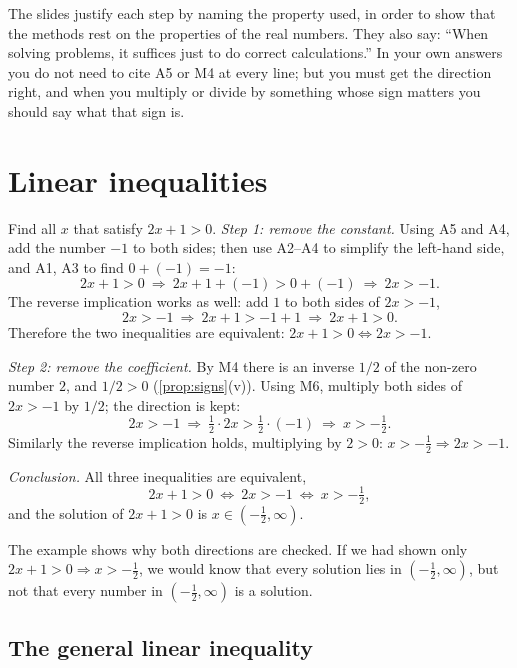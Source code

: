 \begin{note}
The slides justify each step by naming the property used, in order to show that the methods rest on the
properties of the real numbers. They also say: ``When solving problems, it suffices just to do correct
calculations.''  In your own answers you do not need to cite A5 or M4 at every line; but you
must get the direction right, and when you multiply or divide by something whose sign matters you should say
what that sign is.
\end{note}

\section{Linear inequalities}\label{sec:linear-ineq}

\begin{example}
Find all $x$ that satisfy $2x+1>0$. 
\solution
\emph{Step 1: remove the constant.} Using A5 and A4, add the number $-1$ to both sides; then use A2--A4 to
simplify the left-hand side, and A1, A3 to find $0+(-1)=-1$:
\[
2x+1>0\ \Longrightarrow\ 2x+1+(-1)>0+(-1)\ \Longrightarrow\ 2x>-1.
\]
The reverse implication works as well: add $1$ to both sides of $2x>-1$,
\[
2x>-1\ \Longrightarrow\ 2x+1>-1+1\ \Longrightarrow\ 2x+1>0.
\]
Therefore the two inequalities are equivalent: $2x+1>0\Leftrightarrow 2x>-1$.

\emph{Step 2: remove the coefficient.} By M4 there is an inverse $1/2$ of the non-zero number $2$, and
$1/2>0$ (\cref{prop:signs}(v)). Using M6, multiply both sides of $2x>-1$ by $1/2$; the direction is kept:
\[
2x>-1\ \Longrightarrow\ \tfrac12\cdot 2x>\tfrac12\cdot(-1)\ \Longrightarrow\ x>-\tfrac12.
\]
Similarly the reverse implication holds, multiplying by $2>0$: $x>-\tfrac12\Rightarrow 2x>-1$.

\emph{Conclusion.} All three inequalities are equivalent,
\[
2x+1>0\ \Longleftrightarrow\ 2x>-1\ \Longleftrightarrow\ x>-\tfrac12,
\]
and the solution of $2x+1>0$ is $x\in(-\tfrac12,\infty)$.
\end{example}

The example shows why both directions are checked. If we had shown only $2x+1>0\Rightarrow x>-\tfrac12$, we
would know that every solution lies in $(-\tfrac12,\infty)$, but not that every number in $(-\tfrac12,\infty)$
is a solution.

\subsection{The general linear inequality}

